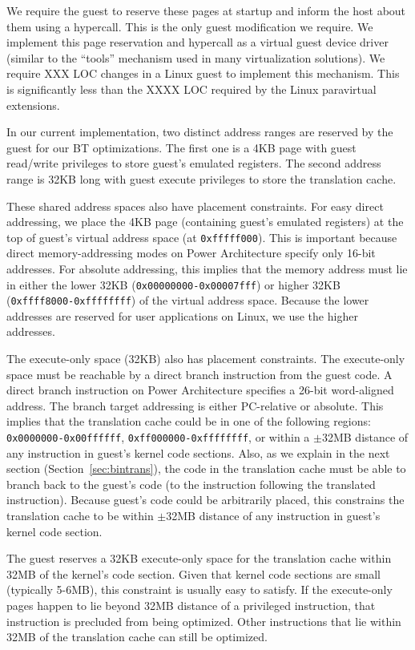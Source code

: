 \documentclass[10pt,twocolumn]{article}
\begin{document}
We require the guest to reserve these pages at startup and inform the host about
them using a hypercall.
This is the only guest modification we require.
We implement this page reservation
and hypercall as a virtual guest device driver (similar to the ``tools'' mechanism
used in many virtualization solutions).
We require XXX LOC changes in a Linux guest to implement this mechanism. This is
significantly less than the XXXX LOC required by the Linux paravirtual
extensions.

In our current implementation, two distinct address ranges are reserved by the
guest for our BT optimizations.
The first one is a 4KB page with guest read/write privileges
to store guest's emulated registers.  The second address range is 32KB long
with guest execute privileges to store the translation cache.

These shared address spaces also have placement constraints. For easy direct
addressing, we place the 4KB page (containing guest's emulated registers) at
the top of guest's virtual address space (at {\tt 0xfffff000}). This is important 
because direct memory-addressing modes on Power Architecture specify only 16-bit
addresses. For absolute addressing, this implies that the memory
address must lie in either
the lower 32KB ({\tt 0x00000000-0x00007fff}) or higher
32KB ({\tt 0xffff8000-0xffffffff}) of the virtual address space. Because the lower
addresses are reserved for user applications on Linux, we use the higher addresses.

The execute-only space (32KB) also has placement
constraints. The execute-only space must be reachable
by a direct branch instruction from the guest code. A direct branch instruction
on Power Architecture specifies a 26-bit
word-aligned address. The branch target addressing is either PC-relative
or absolute. This implies that the translation cache could be
in one of the following regions: {\tt 0x0000000-0x00ffffff}, {\tt 0xff000000-0xffffffff},
or within a $\pm$32MB distance of any instruction in guest's kernel code sections.
Also, as we explain in the
next section (Section~\ref{sec:bintrans}), the code in the translation cache must
be able to branch
back to the guest's code (to the instruction following the translated instruction).
Because guest's code could be arbitrarily placed, this constrains the translation
cache to be within $\pm$32MB distance of any instruction in
guest's kernel code section.

The guest reserves a 32KB execute-only space for the
translation cache within 32MB of the kernel's code
section. Given that kernel code sections are small (typically 5-6MB),
this constraint is usually easy to satisfy. If the execute-only
pages happen to lie beyond 32MB distance of a privileged instruction, that
instruction is precluded from being optimized. Other instructions that lie
within 32MB of the translation cache can still be optimized.
\end{document}

